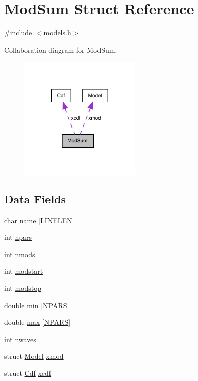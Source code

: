 \hypertarget{struct_mod_sum}{}\section{Mod\+Sum Struct Reference}
\label{struct_mod_sum}


{\ttfamily \#include $<$models.\+h$>$}



Collaboration diagram for Mod\+Sum\+:
\nopagebreak
\begin{figure}[H]
\begin{center}
\leavevmode
\includegraphics[width=164pt]{struct_mod_sum__coll__graph}
\end{center}
\end{figure}
\subsection*{Data Fields}
\begin{DoxyCompactItemize}
\item 
char \hyperlink{struct_mod_sum_a360933be5b04ace92a3d9d723a889fda}{name} \mbox{[}\hyperlink{wind__updates2d_8c_a764eaf37b6117ac7a17b1c049c1d2d16}{L\+I\+N\+E\+L\+EN}\mbox{]}
\item 
int \hyperlink{struct_mod_sum_acdae6177bed0c926e9e494fca75dd1be}{npars}
\item 
int \hyperlink{struct_mod_sum_aa4f5d4bf3e99f8ebacb170f7ac660d39}{nmods}
\item 
int \hyperlink{struct_mod_sum_a41fef05c528b70fa8216c4ac3c8c8238}{modstart}
\item 
int \hyperlink{struct_mod_sum_a5d33cc5bdf1c37261fd3894363fd3559}{modstop}
\item 
double \hyperlink{struct_mod_sum_a37362f221d9d907352d0316899cd166a}{min} \mbox{[}\hyperlink{models_8h_a4a80e098a43386a893ebc656b14e636c}{N\+P\+A\+RS}\mbox{]}
\item 
double \hyperlink{struct_mod_sum_ad2afe982f87b1ca3aa688dde9c015ec2}{max} \mbox{[}\hyperlink{models_8h_a4a80e098a43386a893ebc656b14e636c}{N\+P\+A\+RS}\mbox{]}
\item 
int \hyperlink{struct_mod_sum_a5a51b3b8e646913e986e827121ec0ceb}{nwaves}
\item 
struct \hyperlink{struct_model}{Model} \hyperlink{struct_mod_sum_a64d79a8a3733c76b1f8f1d81213e974e}{xmod}
\item 
struct \hyperlink{struct_cdf}{Cdf} \hyperlink{struct_mod_sum_ac90994fb16680639054d38eda5c411f0}{xcdf}
\end{DoxyCompactItemize}


